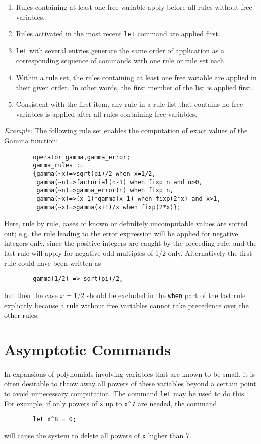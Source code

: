 \begin{enumerate}
\item Rules containing at least one free variable apply before all rules
without free variables.
\item Rules activated in the most recent \texttt{let}
command are applied first.
\item \texttt{let} with several entries generate
the same order of application as a corresponding sequence of commands with
one rule or rule set each.
\item Within a rule set, the rules containing at least
one free variable are applied in their given order.
In other words, the first member of the list is applied first.
\item Consistent with the first item, any rule in a rule list that
contains no free variables is applied after all rules containing free
variables.
\end{enumerate}
\textit{Example:} The following rule set enables the computation of exact
values of the Gamma function:
\begin{verbatim}
        operator gamma,gamma_error;
        gamma_rules :=
        {gamma(~x)=>sqrt(pi)/2 when x=1/2,
         gamma(~n)=>factorial(n-1) when fixp n and n>0,
         gamma(~n)=>gamma_error(n) when fixp n,
         gamma(~x)=>(x-1)*gamma(x-1) when fixp(2*x) and x>1,
         gamma(~x)=>gamma(x+1)/x when fixp(2*x)};
\end{verbatim}
Here, rule by rule, cases of known or definitely uncomputable values
are sorted out; e.g. the rule leading to the error expression
will be applied for negative integers only, since the positive
integers are caught by the preceding rule, and the
last rule will apply for negative odd multiples of $1/2$ only.
Alternatively the first rule could have been written as
\begin{verbatim}
        gamma(1/2) => sqrt(pi)/2,
\end{verbatim}
but then the case $x=1/2$ should be excluded in the \texttt{when} part of the
last rule explicitly because a rule without free variables cannot take
precedence over the other rules.

\section{Asymptotic Commands} 
\label{sec-asymp}
In expansions of polynomials involving variables that are known to be
small, it is often desirable to throw away all powers of these variables
beyond a certain point to avoid unnecessary computation.  The command 
\texttt{let} may be used to do this.  For example, if only powers of \texttt{x} up to
\texttt{x\textasciicircum 7} are needed, the command
\begin{verbatim}
        let x^8 = 0;
\end{verbatim}
will cause the system to delete all powers of \texttt{x} higher than 7.

